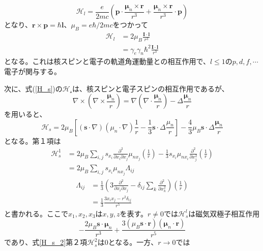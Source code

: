 \documentclass[11pt,a4j]{jreport}
\begin{document}
\begin{equation}
  \mathcal{H}_l=\frac{e}{2mc}\left(\bm p\cdot\frac{\bm{\mu}_n\times\bm{r}}{r^3}+\frac{\bm{\mu}_n\times\bm{r}}{r^3}\cdot\bm{p}\right)
\end{equation}
となり、$\bm{r}\times\bm{p}=\hbar\bm{l}$、$\mu_B=e\hbar/2mc$をつかって
  \begin{align}
    \mathcal{H}_l&=2\mu_B\frac{\bm{I}\cdot\bm{l}}{r^3}\\
    &=\gamma_e\gamma_n\hbar^2\frac{\bm{I}\cdot\bm{l}}{r^3}
    \label{H_orb}
  \end{align}
となる。これは核スピンと電子の軌道角運動量との相互作用で、$l\leq1$の$p,d,f,\cdots$電子が関与する。\par
次に、式(\ref{H_s})の$\mathcal{H_s}$は、核スピンと電子スピンの相互作用であるが、
\begin{equation}
  \nabla \times \left( \nabla \times \frac{\bm{\mu}_n}{r} \right) = \nabla\left( \nabla \cdot \frac{\bm{\mu}_n}{r} \right) - \Delta \frac{\bm{\mu}_n}{r}
\end{equation}
を用いると、
\begin{equation}
  \mathcal{H}_s=2\mu_B\left[(\bm{s}\cdot\nabla)(\mu_n\cdot\nabla)\frac{1}{r}-\frac{1}{3}\bm{s}\cdot\Delta\frac{\mu_n}{r}\right]-\frac{4}{3}\mu_B\bm{s}\cdot\Delta\frac{\bm{\mu}_n}{r}
  \label{H_s_2}
\end{equation}
となる。第１項は
\begin{align}
  \mathcal{H}_s^1 &= 2 \mu_B \sum_{i,j} s_{x_i} \frac{\partial^2}{\partial x_i \partial x_j} \mu_{n x_j} \left( \frac{1}{r} \right) - \frac{1}{3} s_{x_i} \mu_{n x_i} \frac{\partial^2}{\partial x_j^2} \left( \frac{1}{r} \right)\\
  &=2\mu_B \sum_{i,j} s_{x_i} \mu_{n x_j} \Lambda_{ij}
\end{align}
\begin{align}
  \Lambda_{ij} &= \frac{1}{3} \left(3 \frac{\partial^2}{\partial x_i \partial x_j} - \delta_{ij} \sum_k \frac{\partial^2}{\partial x_k^2} \right) \left( \frac{1}{r} \right)\\
  &= \frac{1}{3} \frac{3x_i x_j - r^2 \delta_{ij}}{r^5}
\end{align}
と書かれる。ここで$x_1,x_2,x_3$は$x,y,z$を表す。$r\neq0$では$\mathcal{H}_s^l$は磁気双極子相互作用
\begin{equation}
  -\frac{2\mu_B\bm{s}\cdot\bm{\mu}_n}{r^3}+\frac{3(\mu_B\bm{s}\cdot\bm{r})(\bm{\mu}_n\cdot\bm{r})}{r^5}
\end{equation}
であり、式\ref{H_s_2}第２項$\mathcal{H}_s^2$は0となる。一方、$r\to0$では
\end{document}
